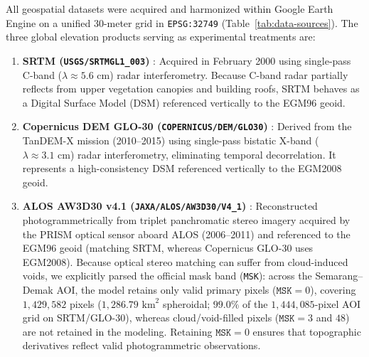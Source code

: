\documentclass[11pt,twoside]{article}
\begin{document}
All geospatial datasets were acquired and harmonized within Google Earth Engine \cite{gorelick2017} on a unified 30-meter grid in \texttt{EPSG:32749} (Table~\ref{tab:data-sources}). The three global elevation products serving as experimental treatments are:
\begin{enumerate}
\item \textbf{SRTM (\texttt{USGS/\allowbreak SRTMGL1\_003})} \cite{farr2007}: Acquired in February 2000 using single-pass C-band ($\lambda \approx 5.6\text{ cm}$) radar interferometry. Because C-band radar partially reflects from upper vegetation canopies and building roofs, SRTM behaves as a Digital Surface Model (DSM) referenced vertically to the EGM96 geoid.
\item \textbf{Copernicus DEM GLO-30 (\texttt{COPERNICUS/\allowbreak DEM/\allowbreak GLO30})} \cite{esa_glo30}: Derived from the TanDEM-X mission (2010--2015) using single-pass bistatic X-band ($\lambda \approx 3.1\text{ cm}$) radar interferometry, eliminating temporal decorrelation. It represents a high-consistency DSM referenced vertically to the EGM2008 geoid.
\item \textbf{ALOS AW3D30 v4.1 (\texttt{JAXA/\allowbreak ALOS/\allowbreak AW3D30/\allowbreak V4\_1})} \cite{tadono2016}: Reconstructed photogrammetrically from triplet panchromatic stereo imagery acquired by the PRISM optical sensor aboard ALOS (2006--2011) and referenced to the EGM96 geoid (matching SRTM, whereas Copernicus GLO-30 uses EGM2008). Because optical stereo matching can suffer from cloud-induced voids, we explicitly parsed the official mask band (\texttt{MSK}): across the Semarang--Demak AOI, the model retains only valid primary pixels ($\texttt{MSK}=0$), covering $1{,}429{,}582$ pixels ($1{,}286.79\text{ km}^2$ spheroidal; $99.0\%$ of the $1{,}444{,}085$-pixel AOI grid on SRTM/GLO-30), whereas cloud/void-filled pixels ($\texttt{MSK}=3$ and $48$) are not retained in the modeling. Retaining $\texttt{MSK}=0$ ensures that topographic derivatives reflect valid photogrammetric observations.
\end{enumerate}
\end{document}
